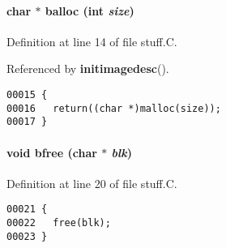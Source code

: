 \paragraph{\setlength{\rightskip}{0pt plus 5cm}char $\ast$ balloc (int {\em size})}\hfill



Definition at line 14 of file stuff.C.

Referenced by {\bf initimagedesc}().\small\begin{verbatim}00015 {
00016   return((char *)malloc(size));
00017 }
\end{verbatim}\normalsize 
\label{stuff.C_a3}
\paragraph{\setlength{\rightskip}{0pt plus 5cm}void bfree (char $\ast$ {\em blk})}\hfill



Definition at line 20 of file stuff.C.\small\begin{verbatim}00021 {
00022   free(blk);
00023 }
\end{verbatim}\normalsize 
